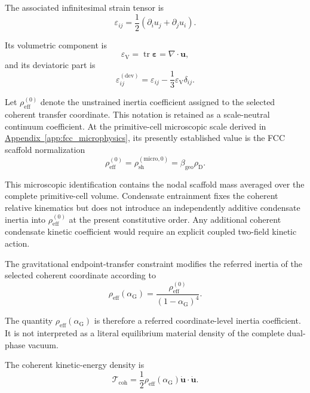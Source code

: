The associated infinitesimal strain tensor is
\begin{equation}
    \varepsilon_{ij} = \frac{1}{2} \left( \partial_{i}u_{j} + \partial_{j}u_{i} \right).
\end{equation}

Its volumetric component is
\begin{equation}
    \varepsilon_{\mathrm{V}} = \operatorname{tr}\boldsymbol{\varepsilon} = \nabla\cdot\mathbf{u},
\end{equation}
and its deviatoric part is
\begin{equation}
    \varepsilon_{ij}^{(\mathrm{dev})} = \varepsilon_{ij} - \frac{1}{3}\varepsilon_{\mathrm{V}}\delta_{ij}.
\end{equation}

Let $\rho_{\mathrm{eff}}^{(0)}$ denote the unstrained inertia coefficient assigned to the selected coherent transfer coordinate. This notation is retained as a scale-neutral continuum coefficient. At the primitive-cell microscopic scale derived in \hyperref[app:fcc_microphysics]{Appendix~\ref*{app:fcc_microphysics}}, its presently established value is the FCC scaffold normalization
\begin{equation}
    \rho_{\mathrm{eff}}^{(0)} = \rho_{\mathrm{sh}}^{(\mathrm{micro},0)} = \beta_{\mathrm{geo}}\rho_{\mathrm{D}}.
\end{equation}

This microscopic identification contains the nodal scaffold mass averaged over the complete primitive-cell volume. Condensate entrainment fixes the coherent relative kinematics but does not introduce an independently additive condensate inertia into $\rho_{\mathrm{eff}}^{(0)}$ at the present constitutive order. Any additional coherent condensate kinetic coefficient would require an explicit coupled two-field kinetic action.

The gravitational endpoint-transfer constraint modifies the referred inertia of the selected coherent coordinate according to
\begin{equation}
    \rho_{\mathrm{eff}}(\alpha_{\mathrm{G}}) = \frac{\rho_{\mathrm{eff}}^{(0)}}{\left(1-\alpha_{\mathrm{G}}\right)^4}.
\end{equation}

The quantity $\rho_{\mathrm{eff}}(\alpha_{\mathrm{G}})$ is therefore a referred coordinate-level inertia coefficient. It is not interpreted as a literal equilibrium material density of the complete dual-phase vacuum.

The coherent kinetic-energy density is
\begin{equation}
    \mathcal{T}_{\mathrm{coh}} = \frac{1}{2}\rho_{\mathrm{eff}}(\alpha_{\mathrm{G}})\dot{\mathbf{u}}\cdot\dot{\mathbf{u}}.
\end{equation}

